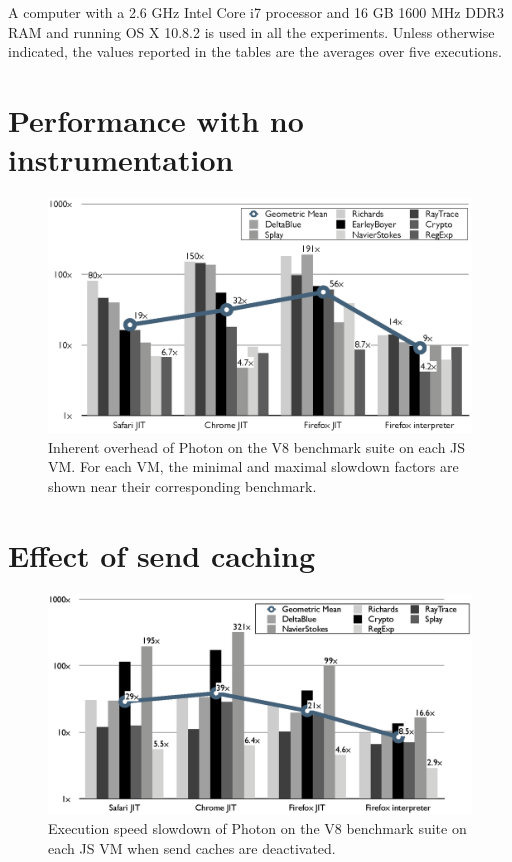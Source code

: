 A computer with a 2.6 GHz Intel Core i7 processor and 16 GB 1600 MHz
DDR3 RAM and running OS X 10.8.2 is used in all the experiments.
Unless otherwise indicated, the values reported in the tables are the
averages over five executions.

\section{Performance with no instrumentation}

\begin{figure}[htbp]
\begin{center}
\includegraphics[width=.85\textwidth]{figures/InherentOverhead}
\caption[Inherent overhead of Photon]{Inherent overhead of Photon on the V8
benchmark suite on each JS VM. For each VM, the minimal and maximal slowdown
factors are shown near their corresponding benchmark.}
\label{fig:inherent-overhead-v8-benchmarks}
\end{center}
\end{figure}

\section{Effect of send caching}

\begin{figure}[htbp]
\begin{center}
\includegraphics[width=.85\textwidth]{figures/effectSendCaches}
\caption[Execution speed slowdown of Photon with deactivated send caches]{Execution speed slowdown of Photon on the V8 benchmark suite on each JS VM when send caches are deactivated.}
\label{fig:send-cache-effect}
\end{center}
\end{figure}


